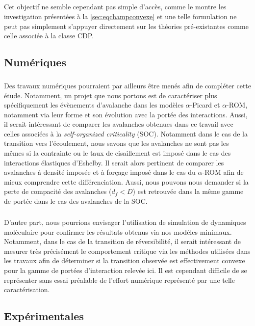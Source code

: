 \subparagraph{}Cet objectif ne semble cependant pas simple d'accès, comme le montre les investigation présentées à la \autoref{sec:eqchampconvexe} et une telle formulation ne peut pas simplement s'appuyer directement sur les théories pré-existantes comme celle associée à la classe CDP.

\subsection*{Numériques}

\subparagraph{}Des travaux numériques pourraient par ailleurs être menés afin de compléter cette étude. Notamment, un projet que nous portons est de caractériser plus spécifiquement les évènements d'avalanche dans les modèles $\alpha$-Picard et $\alpha$-ROM, notamment via leur forme \cite{wiese_theory_2022} et son évolution avec la portée des interactions. Aussi, il serait intéressant de comparer les avalanches obtenues dans ce travail avec celles associées à la \textit{self-organized criticality} (SOC). Notamment dans le cas de la transition vers l'écoulement, nous savons que les avalanches ne sont pas les mêmes si la contrainte ou le taux de cisaillement est imposé dans le cas des interactions élastiques d'Eshelby. Il serait alors pertinent de comparer les avalanches à densité imposée et à forçage imposé dans le cas du $\alpha$-ROM afin de mieux comprendre cette différenciation. Aussi, nous pouvons nous demander si la perte de compacité des avalanches ($d_f < D$) est retrouvée dans la même gamme de portée dans le cas des avalanches de la SOC.

\subparagraph{}D'autre part, nous pourrions envisager l'utilisation de simulation de dynamiques moléculaire pour confirmer les résultats obtenus via nos modèles minimaux. Notamment, dans le cas de la transition de réversibilité, il serait intéressant de mesurer très précisément le comportement critique via les méthodes utilisées dans les travaux \cite{metzger_irreversibility_2010, ge_rheology_2022} afin de déterminer si la transition observée est effectivement convexe pour la gamme de portées d'interaction relevée ici. Il est cependant difficile de se représenter sans essai préalable de l'effort numérique représenté par une telle caractérisation.

\subsection*{Expérimentales}

